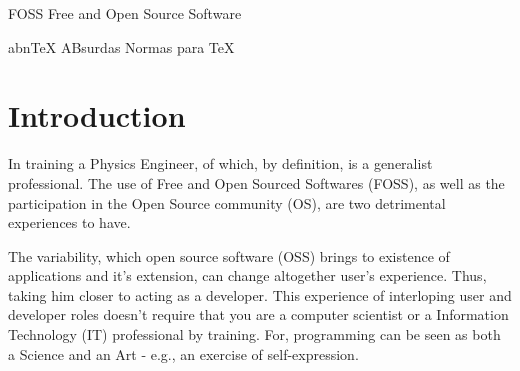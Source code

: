 \documentclass[
12pt,				%
openright,			%
oneside,			%
a4paper,			%
brazil,				%
english,			%
]{abntex2}
\begin{document}

\begin{siglas}
  \item[FOSS] Free and Open Source Software  
  \item[abnTeX] ABsurdas Normas para TeX
\end{siglas}


\tableofcontents*
\cleardoublepage



\textual


\chapter[Introduction]{Introduction}

In training a Physics Engineer, of which, by definition, is a generalist professional. The use of Free and Open Sourced Softwares (FOSS), as well as the participation in the Open Source community (OS), are two detrimental experiences to have.

The variability, which open source software (OSS) brings to existence of applications and it's extension, can change altogether user's experience. Thus, taking him closer to acting as a developer. This experience of interloping user and developer roles doesn't require that you are a computer scientist or a Information Technology (IT) professional by training. For, programming can be seen as both a Science and an Art \cite{knuth1968art} - e.g., an exercise of self-expression.
\end{document}
